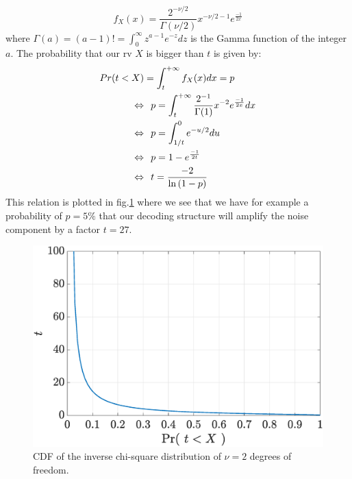 \begin{equation}
    f_X(x) = \frac{2^{-\nu/2}}{\Gamma (\nu/2)} x^{-\nu/2-1} e^{\frac{-1}{2x}}
\end{equation}
where $\Gamma(a) = (a-1)! = \int_0^\infty z^{a-1} e^{-z} dz$ is the Gamma function of the integer $a$. The probability that our \gls{rv} $X$ is bigger than $t$ is given by:
\begin{equation}
    \begin{split}
        Pr( t < X ) &= \int_t^{+\infty} f_X(x) dx = p \\
        \Leftrightarrow & \hspace{.1in} p =  \int_t^{+\infty} \frac{2^{-1}}{\Gamma (1)} x^{-2} e^{\frac{-1}{2x}} dx \\
        \Leftrightarrow & \hspace{.1in} p = \int_{1/t}^0 e^{-u/2} du \\
        \Leftrightarrow & \hspace{.1in} p = 1 - e^{\frac{-1}{2t}}\\
        \Leftrightarrow & \hspace{.1in} t = \frac{-2}{\ln{(1-p)}}
    \end{split}
\end{equation}
This relation is plotted in fig.\ref{fig:cdf_inverse_chi_square} where we see that we have for example a probability of $p=5\%$ that our decoding structure will amplify the noise component by a factor $t=27$.
\begin{figure}[htb!]
    \centering
    \centerline{\includegraphics[width = .65\textwidth]{graphs/inverse_chi_square_cdf.eps}}
    \caption{CDF of the inverse chi-square distribution of $\nu = 2$ degrees of freedom.}
    \label{fig:cdf_inverse_chi_square}
\end{figure} 










